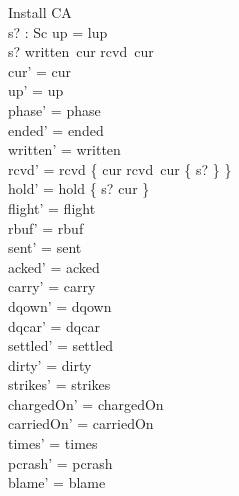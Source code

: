 \documentclass[a4paper,10pt,fleqn]{article}
\begin{document}
\begin{schema}{Install}
  \Delta CA \\
  s? : Sc
\where
  up = lup \\
  s? \in written~cur \setminus rcvd~cur \\
  cur' = cur \\
  up' = up \\
  phase' = phase \\
  ended' = ended \\
  written' = written \\
  rcvd' = rcvd \oplus \{ cur \mapsto rcvd~cur \cup \{ s? \} \} \\
  hold' = hold \oplus \{ s? \mapsto cur \} \\
  flight' = flight \\
  rbuf' = rbuf \\
  sent' = sent \\
  acked' = acked \\
  carry' = carry \\
  dqown' = dqown \\
  dqcar' = dqcar \\
  settled' = settled \\
  dirty' = dirty \\
  strikes' = strikes \\
  chargedOn' = chargedOn \\
  carriedOn' = carriedOn \\
  times' = times \\
  pcrash' = pcrash \\
  blame' = blame
\end{schema}
\end{document}
